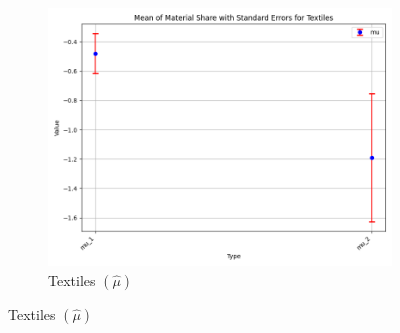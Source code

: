 \documentclass{article}
\begin{document}
\begin{figure}[ht!]
\begin{subfigure}[t]{0.32\textwidth}
        \includegraphics[width=\textwidth]{figure/empirical_stat_normal_mu_with_error_bars_Textiles.png}
        \caption{Textiles $(\hat\mu)$}
    \end{subfigure}
\end{figure}
\end{document}
